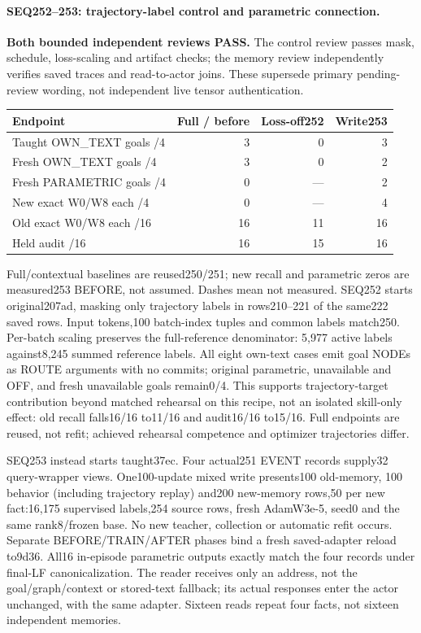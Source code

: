 \documentclass[11pt]{article}
\begin{document}
\paragraph{SEQ252--253: trajectory-label control and parametric connection.}
\textbf{Both bounded independent reviews PASS.} The control review
passes mask, schedule, loss-scaling and artifact checks; the memory review
independently verifies saved traces and read-to-actor joins. These supersede
primary pending-review wording, not independent live tensor authentication.
\begin{center}
\small
\begin{tabular}{lrrr}
\toprule
Endpoint & Full / before & Loss-off252 & Write253 \\
\midrule
Taught OWN\_TEXT goals /4 & 3 & 0 & 3 \\
Fresh OWN\_TEXT goals /4 & 3 & 0 & 2 \\
Fresh PARAMETRIC goals /4 & 0 & --- & 2 \\
New exact W0/W8 each /4 & 0 & --- & 4 \\
Old exact W0/W8 each /16 & 16 & 11 & 16 \\
Held audit /16 & 16 & 15 & 16 \\
\bottomrule
\end{tabular}
\end{center}
Full/contextual baselines are reused250/251; new recall and parametric zeros
are measured253 BEFORE, not assumed. Dashes mean not measured.
SEQ252 starts original207ad, masking only trajectory labels in rows210--221
of the same222 saved rows. Input tokens,100 batch-index tuples and common
labels match250. Per-batch scaling preserves the full-reference denominator:
5,977 active labels against8,245 summed reference labels. All eight own-text
cases emit goal NODEs as ROUTE arguments with no commits; original parametric,
unavailable and OFF, and fresh unavailable goals remain0/4. This supports
trajectory-target contribution beyond matched rehearsal on this recipe, not
an isolated skill-only effect: old recall falls16/16 to11/16 and audit16/16
to15/16. Full endpoints are reused, not refit; achieved rehearsal competence
and optimizer trajectories differ.

SEQ253 instead starts taught37ec. Four actual251 EVENT records supply32
query-wrapper views. One100-update mixed write presents100 old-memory,
100 behavior (including trajectory replay) and200 new-memory rows,50 per new
fact:16,175 supervised labels,254 source rows, fresh AdamW3e-5, seed0 and the
same rank8/frozen base. No new teacher, collection or automatic refit occurs.
Separate BEFORE/TRAIN/AFTER phases bind a fresh saved-adapter reload to9d36.
All16 in-episode parametric outputs exactly match the four records under
final-LF canonicalization. The reader receives only an address, not the
goal/graph/context or stored-text fallback; its actual responses enter the
actor unchanged, with the same adapter. Sixteen reads repeat four facts,
not sixteen independent memories.
\end{document}
